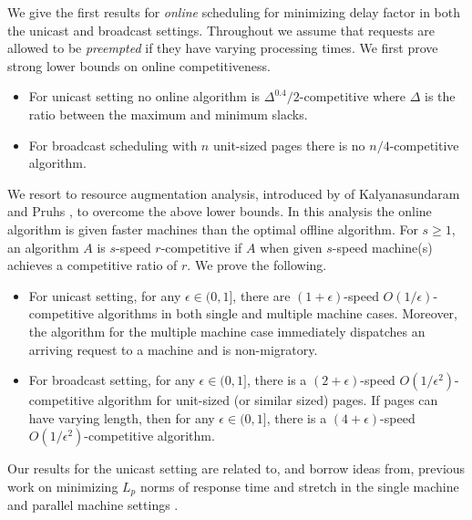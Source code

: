 \documentclass[11pt]{article}
\newcommand{\eps}{\epsilon}
\begin{document}
\medskip
{} We give the first results for {\em online}
scheduling for minimizing delay factor in both the unicast and
broadcast settings. Throughout we assume that requests are allowed to
be {\em preempted} if they have varying processing times. We first
prove strong lower bounds on online competitiveness.
\begin{itemize}
\item For unicast setting no online algorithm is
  $\Delta^{0.4}/2$-competitive where $\Delta$ is the ratio between
  the maximum and minimum slacks.
\item For broadcast scheduling with $n$ unit-sized pages there is no
$n/4$-competitive algorithm.
\end{itemize}
We resort to resource augmentation analysis, introduced by of
Kalyanasundaram and Pruhs \cite{KalyanasundaramP95}, to overcome the
above lower bounds. In this analysis the online algorithm is given
faster machines than the optimal offline algorithm. For $s \ge 1$, an
algorithm $A$ is $s$-speed $r$-competitive if $A$ when given $s$-speed
machine(s) achieves a competitive ratio of $r$. We prove the
following.
\begin{itemize}
\item For unicast setting, for any $\eps \in (0,1]$, there are $(1+\eps)$-speed
  $O(1/\eps)$-competitive algorithms in both single and multiple machine
  cases. Moreover, the algorithm for the multiple machine case immediately
  dispatches an arriving request to a machine and is non-migratory.
\item For broadcast setting, for any $\eps \in (0,1]$, there is a
  $(2+\eps)$-speed $O(1/\eps^2)$-competitive algorithm for unit-sized
  (or similar sized) pages.  If pages can have varying length, then
  for any $\eps \in (0,1]$, there is a $(4+\eps)$-speed
  $O(1/\eps^2)$-competitive algorithm.
\end{itemize}

Our results for the unicast setting are related to, and borrow
ideas from, previous work on minimizing $L_p$ norms of response
time and stretch \cite{BansalP03} in the single machine and
parallel machine settings \cite{AvrahamiA03,ChekuriGKK04}.
\end{document}

